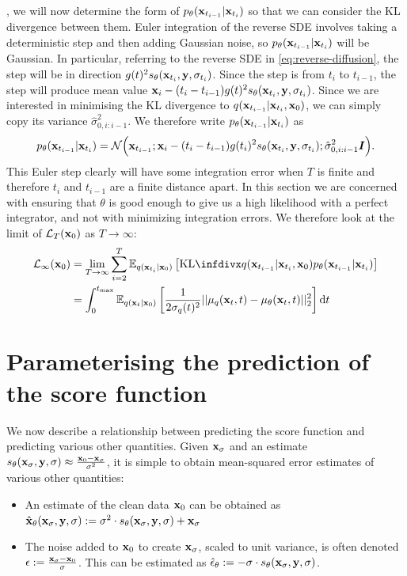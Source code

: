 , we will now determine the form of $p_\theta({\mathbf{x}}_{t_{i-1}}|{\mathbf{x}}_{t_i})$ so that we can consider the KL divergence between them. Euler integration of the reverse SDE involves taking a deterministic step and then adding Gaussian noise, so $p_\theta({\mathbf{x}}_{t_{i-1}}|{\mathbf{x}}_{t_i})$ will be Gaussian. In particular, referring to the reverse SDE in \cref{eq:reverse-diffusion}, the step will be in direction $g(t)^2 s_\theta({\mathbf{x}}_{t_i}, {\mathbf{y}}, \sigma_{t_i})$. Since the step is from $t_i$ to $t_{i-1}$, the step will produce mean value ${\mathbf{x}}_i - (t_i-t_{i-1}) g(t)^2 s_\theta({\mathbf{x}}_{t_i}, {\mathbf{y}}, \sigma_{t_i})$.
%
Since we are interested in minimising the KL divergence to $q({\mathbf{x}}_{t_{i-1}} | {\mathbf{x}}_{t_i}, {\mathbf{x}}_0)$, we can simply copy its variance $\hat{\sigma}_{0,i:i-1}^2$. We therefore write $p_\theta({\mathbf{x}}_{t_{i-1}}|{\mathbf{x}}_{t_i})$ as
\begin{equation}
    p_\theta({\mathbf{x}}_{t_{i-1}}|{\mathbf{x}}_{t_i}) = {\mathcal{N}} \Big( {\mathbf{x}}_{t_{i-1}}; {\mathbf{x}}_i-(t_i-t_{i-1}) g(t_i)^2 s_\theta({\mathbf{x}}_{t_i}, {\mathbf{y}}, \sigma_{t_i}); \hat{\sigma}_{0,i:i-1}^2 {\bm{I}} \Big).
\end{equation}
This Euler step clearly will have some integration error when $T$ is finite and therefore $t_i$ and $t_{i-1}$ are a finite distance apart. In this section we are concerned with ensuring that $\theta$ is good enough to give us a high likelihood with a perfect integrator, and not with minimizing integration errors. We therefore look at the limit of $\mathcal{L}_T({\mathbf{x}}_0)$ as $T \rightarrow \infty$:
\begin{align}
    \mathcal{L}_\infty(\rvx_0) &= \lim_{T\rightarrow\infty} \sum_{i=2}^T \EX_{q(\rvx_{t_i}|\rvx_0)} \left[ \kl{q(\rvx_{t_{i-1}} | \rvx_{t_i}, \rvx_0)}{p_\theta(\rvx_{t_{i-1}} | \rvx_{t_i})} \right] \\
    &= \int_0^{t_\text{max}} \EX_{q(\rvx_t|\rvx_0)} \left[ \frac{1}{2\sigma_q(t)^2} || \mu_q(\rvx_t, t) - \mu_\theta(\rvx_t, t) ||_2^2 \right] \mathrm{d}t
\end{align}

\section{Parameterising the prediction of the score function}
We now describe a relationship between predicting the score function and predicting various other quantities. Given ${\mathbf{x}}_\sigma$ and an estimate $s_\theta({\mathbf{x}}_\sigma, {\mathbf{y}}, \sigma) \approx \frac{{\mathbf{x}}_0-{\mathbf{x}}_\sigma}{\sigma^2}$, it is simple to obtain mean-squared error estimates of various other quantities: 
\begin{itemize}
    \item An estimate of the clean data ${\mathbf{x}}_0$ can be obtained as ${\hat{{\mathbf{x}}}_\theta({\mathbf{x}}_\sigma, {\mathbf{y}}, \sigma) :=  \sigma^2 \cdot s_\theta({\mathbf{x}}_\sigma, {\mathbf{y}}, \sigma) + {\mathbf{x}}_\sigma}$
    \item The noise added to ${\mathbf{x}}_0$ to create ${\mathbf{x}}_\sigma$, scaled to unit variance, is often denoted $\epsilon := \frac{{\mathbf{x}}_\sigma-{\mathbf{x}}_0}{\sigma}$. This can be estimated as $\hat{\epsilon}_\theta := - \sigma \cdot s_\theta({\mathbf{x}}_\sigma, {\mathbf{y}}, \sigma)$.
\end{itemize}

